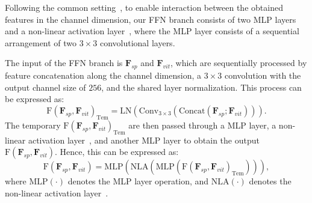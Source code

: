 \myparagraph{\textcolor{blue}{FFN Branch.}} 
Following the common setting~\citep{vaswani2017attention,tolstikhin2021mlp}, to enable interaction between the obtained features in the channel dimension, our FFN branch consists of two MLP layers and a non-linear activation layer~\citep{saxe2013exact,he2023simplifying}, where the MLP layer consists of a sequential arrangement of two $3 \times 3$ convolutional layers.

%
The input of the FFN branch is $\textbf{F}_{sp}$ and $\textbf{F}_{vit}$, which are sequentially processed by feature concatenation along the channel dimension, a $3 \times 3$ convolution with the output channel size of $256$, and the shared layer normalization. This process can be expressed as:
\begin{equation}
\textrm{F}(\textbf{F}_{sp},\textbf{F}_{vit})_{\textrm{Tem}} = \textrm{LN}(\textrm{Conv}_{3 \times 3}(\textrm{Concat}(\textbf{F}_{sp};\textbf{F}_{vit}))).
\label{eq:3}
\end{equation}
The temporary $\textrm{F}(\textbf{F}_{sp},\textbf{F}_{vit})_{\textrm{Tem}}$ are then passed through a MLP layer, a non-linear activation layer~\citep{saxe2013exact}, and another MLP layer to obtain the output $\textrm{F}(\textbf{F}_{sp},\textbf{F}_{vit})$. Hence, this can be expressed as:
\begin{equation}
\textrm{F}(\textbf{F}_{sp},\textbf{F}_{vit}) = \textrm{MLP}(\textrm{NLA}(\textrm{MLP}(\textrm{F}(\textbf{F}_{sp},\textbf{F}_{vit})_{\textrm{Tem}}))),
\label{eq:4}
\end{equation}
where $\textrm{MLP}(\cdot)$ denotes the MLP layer operation, and $\textrm{NLA}(\cdot)$ denotes the non-linear activation layer~\citep{saxe2013exact,he2023simplifying}.

